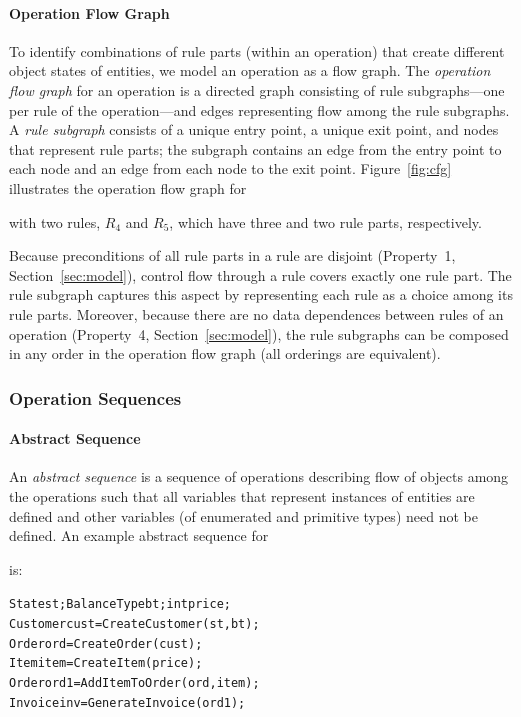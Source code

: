 \paragraph*{Operation Flow Graph} To identify combinations of rule parts (within
an operation) that create different object states of entities, we model an
operation as a flow graph. The \textit{operation flow graph} for an operation is
a directed graph consisting of rule subgraphs---one per rule of the
operation---and edges representing flow among the rule subgraphs. A \textit{rule
  subgraph} consists of a unique entry point, a unique exit point, and nodes
that represent rule parts; the subgraph contains an edge from the entry point to
each node and an edge from each node to the exit point.  Figure~\ref{fig:cfg}
illustrates the operation flow graph for \subject{GenerateInvoice} with two
rules, $R_4$ and $R_5$, which have three and two rule parts, respectively.

Because preconditions of all rule parts in a rule are disjoint (Property~1,
Section~\ref{sec:model}), control flow through a rule covers exactly one rule
part.  The rule subgraph captures this aspect by representing each rule as a
choice among its rule parts. Moreover, because there are no data dependences
between rules of an operation (Property~4, Section~\ref{sec:model}), the rule
subgraphs can be composed in any order in the operation flow graph (\ie all
orderings are equivalent).

\subsubsection{Operation Sequences}

\vskip -10pt
\paragraph*{Abstract Sequence} An \textit{abstract sequence} is a sequence of
operations describing flow of objects among the operations such that all
variables that represent instances of entities are defined and other variables
(of enumerated and primitive types) need not be defined. An example abstract
sequence for \subject{GenerateInvoice} is:

\vspace*{-4pt}
{\scriptsize
\begin{alltt} 
 State st; BalanceType bt; int price;
 Customer cust = CreateCustomer(st, bt);
 Order ord = CreateOrder(cust);	 
 Item item = CreateItem(price);
 Order ord1 = AddItemToOrder(ord, item);
 Invoice inv = GenerateInvoice(ord1);  
\end{alltt}
}
\vspace*{-5pt}

